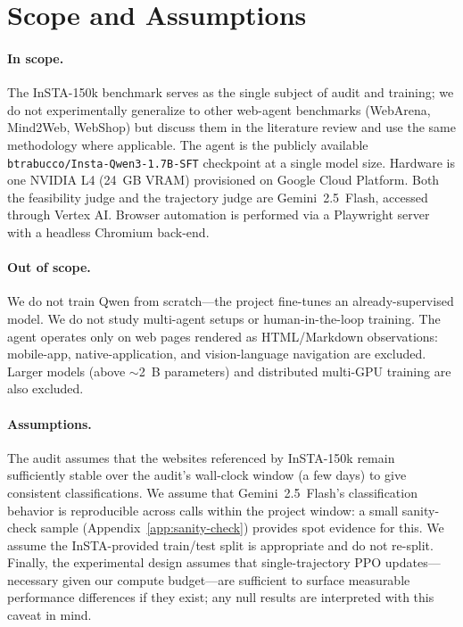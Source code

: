 \documentclass[12pt,a4paper]{report}
\begin{document}
\section{Scope and Assumptions}

\paragraph{In scope.} The InSTA-150k benchmark serves as the single subject of audit and training; we do not experimentally generalize to other web-agent benchmarks (WebArena, Mind2Web, WebShop) but discuss them in the literature review and use the same methodology where applicable. The agent is the publicly available \texttt{btrabucco/Insta-Qwen3-1.7B-SFT} checkpoint at a single model size. Hardware is one NVIDIA L4 (24~GB VRAM) provisioned on Google Cloud Platform. Both the feasibility judge and the trajectory judge are Gemini~2.5~Flash, accessed through Vertex AI. Browser automation is performed via a Playwright server with a headless Chromium back-end.

\paragraph{Out of scope.} We do not train Qwen from scratch---the project fine-tunes an already-supervised model. We do not study multi-agent setups or human-in-the-loop training. The agent operates only on web pages rendered as HTML/Markdown observations: mobile-app, native-application, and vision-language navigation are excluded. Larger models (above $\sim$2~B parameters) and distributed multi-GPU training are also excluded.

\paragraph{Assumptions.} The audit assumes that the websites referenced by InSTA-150k remain sufficiently stable over the audit's wall-clock window (a few days) to give consistent classifications. We assume that Gemini~2.5~Flash's classification behavior is reproducible across calls within the project window: a small sanity-check sample (Appendix~\ref{app:sanity-check}) provides spot evidence for this. We assume the InSTA-provided train/test split is appropriate and do not re-split. Finally, the experimental design assumes that single-trajectory PPO updates---necessary given our compute budget---are sufficient to surface measurable performance differences if they exist; any null results are interpreted with this caveat in mind.
\end{document}
